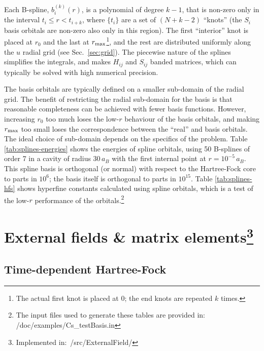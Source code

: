 \documentclass[10pt,twocolumn,a4paper]{article}%
\begin{document}
Each B-spline, $b_i^{(k)}(r)$, is a polynomial of degree $k-1$, that is non-zero only in the interval $t_i\leq r<t_{i+k}$, where $\{t_i\}$ are a set of $(N+k-2)$ ``knots'' (the $S_i$ basis orbitals are non-zero also only in this region).
The first ``interior'' knot is placed at $r_0$ and the last at $r_{\rm max}$\footnote{The actual first knot is placed at 0; the end knots are repeated $k$ times.}, and the rest are distributed uniformly along the $u$ radial grid (see Sec.~\ref{sec:grid}).
The piecewise nature of the splines simplifies the integrals, and makes $H_{ij}$ and $S_{ij}$ banded matrices, which can typically be solved with high numerical precision.


The basis orbitals are typically defined on a smaller sub-domain of the radial grid.
The benefit of restricting the radial sub-domain for the basis is that reasonable completeness can be achieved with fewer basis functions.
However, increasing $r_0$ too much loses the low-$r$ behaviour of the basis orbitals, and making $r_{\rm max}$ too small loses the correspondence between the ``real'' and basis orbitals.
The ideal choice of sub-domain depends on the specifics of the problem.
%
Table \ref{tab:splines-energies} shows the energies of spline orbitals, using 50 B-splines of order 7 in a cavity of radius 30\,$a_B$ with the first internal point at $r=10^{-5}\,a_B$.
This spline basis is orthogonal (or normal) with respect to the Hartree-Fock core to parts in $10^6$; the basis itself is orthogonal to parts in $10^{15}$.
Table \ref{tab:splines-hfs} shows hyperfine constants calculated using spline orbitals, which is a test of the low-$r$ performance of the orbitals.\footnote{The input files used to generate these tables are provided in: /doc/examples/Cs\_testBasis.in}











\section[External fields \& matrix elements]{External fields \& matrix elements\label{sec:tdhf}\footnote{Implemented in:~/src/ExternalField/}}

\subsection{Time-dependent Hartree-Fock}\label{sec:tdhf}
\end{document}
